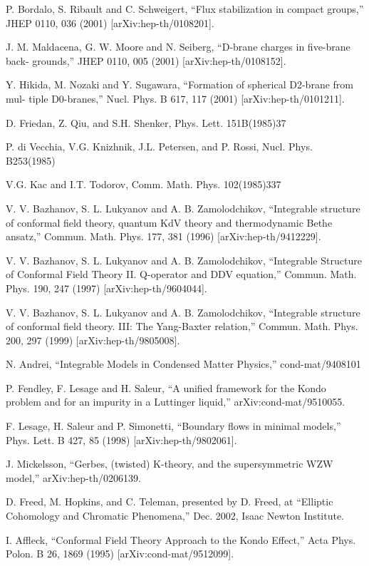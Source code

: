 \documentclass[11pt,a4paper]{ctexart}
\begin{document}
\begin{enumerate}[label={[\arabic*]},leftmargin=*,itemsep=2pt]
\item P. Bordalo, S. Ribault and C. Schweigert, “Flux stabilization in compact groups,” JHEP 0110, 036 (2001) [arXiv:hep-th/0108201].
\item J. M. Maldacena, G. W. Moore and N. Seiberg, “D-brane charges in five-brane back- grounds,” JHEP 0110, 005 (2001) [arXiv:hep-th/0108152].
\item Y. Hikida, M. Nozaki and Y. Sugawara, “Formation of spherical D2-brane from mul- tiple D0-branes,” Nucl. Phys. B 617, 117 (2001) [arXiv:hep-th/0101211].
\item D. Friedan, Z. Qiu, and S.H. Shenker, Phys. Lett. 151B(1985)37
\item P. di Vecchia, V.G. Knizhnik, J.L. Petersen, and P. Rossi, Nucl. Phys. B253(1985)
\item V.G. Kac and I.T. Todorov, Comm. Math. Phys. 102(1985)337
\item V. V. Bazhanov, S. L. Lukyanov and A. B. Zamolodchikov, “Integrable structure of conformal field theory, quantum KdV theory and thermodynamic Bethe ansatz,” Commun. Math. Phys. 177, 381 (1996) [arXiv:hep-th/9412229].
\item V. V. Bazhanov, S. L. Lukyanov and A. B. Zamolodchikov, “Integrable Structure of Conformal Field Theory II. Q-operator and DDV equation,” Commun. Math. Phys. 190, 247 (1997) [arXiv:hep-th/9604044].
\item V. V. Bazhanov, S. L. Lukyanov and A. B. Zamolodchikov, “Integrable structure of conformal field theory. III: The Yang-Baxter relation,” Commun. Math. Phys. 200, 297 (1999) [arXiv:hep-th/9805008].
\item N. Andrei, “Integrable Models in Condensed Matter Physics,” cond-mat/9408101
\item P. Fendley, F. Lesage and H. Saleur, “A unified framework for the Kondo problem and for an impurity in a Luttinger liquid,” arXiv:cond-mat/9510055.
\item F. Lesage, H. Saleur and P. Simonetti, “Boundary flows in minimal models,” Phys. Lett. B 427, 85 (1998) [arXiv:hep-th/9802061].
\item J. Mickelsson, “Gerbes, (twisted) K-theory, and the supersymmetric WZW model,” arXiv:hep-th/0206139.
\item D. Freed, M. Hopkins, and C. Teleman, presented by D. Freed, at “Elliptic Cohomology and Chromatic Phenomena,” Dec. 2002, Isaac Newton Institute.
\item I. Aﬄeck, “Conformal Field Theory Approach to the Kondo Effect,” Acta Phys. Polon. B 26, 1869 (1995) [arXiv:cond-mat/9512099].

\end{enumerate}
\end{document}
